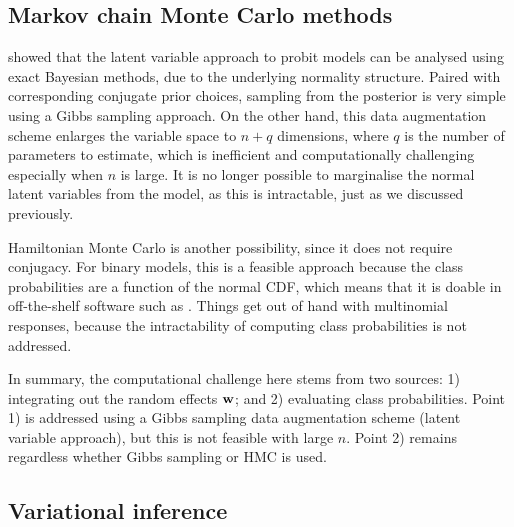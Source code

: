 \subsection{Markov chain Monte Carlo methods}

\citet{albert1993bayesian} showed that the latent variable approach to probit models can be analysed using exact Bayesian methods, due to the underlying normality structure.
Paired with corresponding conjugate prior choices, sampling from the posterior is very simple using a Gibbs sampling approach.
On the other hand, this data augmentation scheme enlarges the variable space to $n+q$ dimensions, where $q$ is the number of parameters to estimate, which is inefficient and computationally challenging especially when $n$ is large.
It is no longer possible to marginalise the normal latent variables from the model, as this is intractable, just as we discussed previously.

Hamiltonian Monte Carlo is another possibility, since it does not require conjugacy.
For binary models, this is a feasible approach because the class probabilities are a function of the normal CDF, which means that it is doable in off-the-shelf software such as .
Things get out of hand with multinomial responses, because the intractability of computing class probabilities is not addressed.

In summary, the computational challenge here stems from two sources: 1) integrating out the random effects ${\mathbf w}$; and 2) evaluating class probabilities.
Point 1) is addressed using a Gibbs sampling data augmentation scheme (latent variable approach), but this is not feasible with large $n$.
Point 2) remains regardless whether Gibbs sampling or HMC is used.

\subsection{Variational inference}

